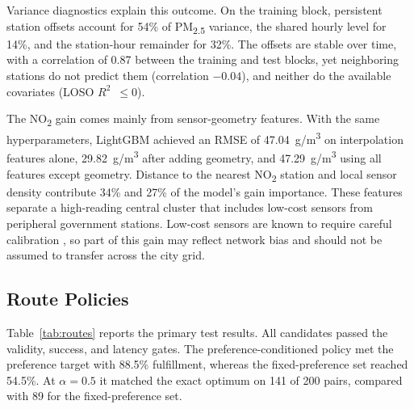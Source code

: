 \documentclass[conference]{IEEEtran}
\newcommand{\pmtf}{PM\textsubscript{2.5}}
\newcommand{\notwo}{NO\textsubscript{2}}
\newcommand{\ugm}{\textmu g/m\textsuperscript{3}}
\newcommand{\rsq}{$R^2$}
\begin{document}
Variance diagnostics explain this outcome. On the training block, persistent station offsets account for 54\% of \pmtf{} variance, the shared hourly level for 14\%, and the station-hour remainder for 32\%. The offsets are stable over time, with a correlation of 0.87 between the training and test blocks, yet neighboring stations do not predict them (correlation $-0.04$), and neither do the available covariates (LOSO \rsq{}~$\leq0$).

The \notwo{} gain comes mainly from sensor-geometry features. With the same hyperparameters, LightGBM achieved an RMSE of 47.04~\ugm{} on interpolation features alone, 29.82~\ugm{} after adding geometry, and 47.29~\ugm{} using all features except geometry. Distance to the nearest \notwo{} station and local sensor density contribute 34\% and 27\% of the model's gain importance. These features separate a high-reading central cluster that includes low-cost sensors from peripheral government stations. Low-cost sensors are known to require careful calibration \cite{karagulian2019}, so part of this gain may reflect network bias and should not be assumed to transfer across the city grid.

\subsection{Route Policies}

Table~\ref{tab:routes} reports the primary test results. All candidates passed the validity, success, and latency gates. The preference-conditioned policy met the preference target with 88.5\% fulfillment, whereas the fixed-preference set reached 54.5\%. At $\alpha=0.5$ it matched the exact optimum on 141 of 200 pairs, compared with 89 for the fixed-preference set.
\end{document}
